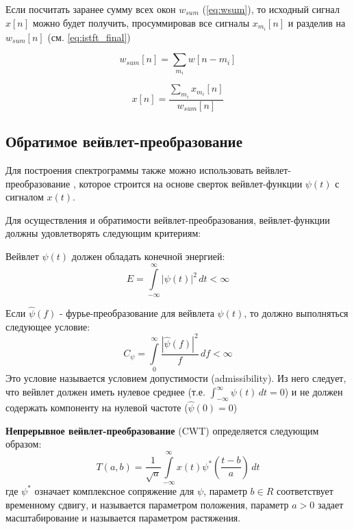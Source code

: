 Если посчитать заранее сумму всех окон $w_{sum}$ (\ref{eq:wsum}), то исходный сигнал $x[n]$ можно будет получить, 
просуммировав все сигналы $x_{m_i}[n]$ и разделив на $w_{sum}[n]$ (см. \ref{eq:istft_final})

\begin{equation}
  w_{sum}[n] = \sum_{m_i} w[n-m_i]
  \label{eq:wsum}
\end{equation}

\begin{equation}
  x[n] = \frac{\sum_{m_i} x_{m_i}[n]}{w_{sum}[n]} 
  \label{eq:istft_final}
\end{equation}


\subsection{Обратимое вейвлет-преобразование}

Для построения спектрограммы также можно использовать вейвлет-преобразование \cite{mallat2008wavelet}, 
которое строится на основе сверток вейвлет-функции $\psi(t)$ с сигналом $x(t)$.

Для осуществления и обратимости вейвлет-преобразования, вейвлет-функции должны удовлетворять следующим критериям:

Вейвлет $\psi(t)$ должен обладать конечной энергией: 
\begin{equation}
  E=\int \limits _{-\infty }^{\infty }{|\psi (t)|}^{2}\,dt<\infty
\end{equation}

Если ${\hat{\psi }}(f)$ - фурье-преобразование для вейвлета $\psi (t)$, то должно выполняться следующее условие:
\begin{equation}
  C_{\psi }=\int \limits _{0}^{\infty }{\frac {{|{\hat {\psi }}(f)|}^{2}}{f}}\,df<\infty
\end{equation}
Это условие называется условием допустимости (admissibility). Из него следует, что вейвлет должен иметь нулевое среднее 
(т.е. $\int_{-\infty}^{\infty}{\psi(t)}\,dt = 0$) и не должен содержать компоненту на нулевой частоте (${\hat{\psi }}(0) = 0$)

\textbf{Непрерывное вейвлет-преобразование} (CWT) \cite{mallat2008wavelet} определяется следующим образом:
\begin{equation}
  T(a,b)={\frac {1}{\sqrt {a}}}\int \limits _{-\infty }^{\infty }x(t)\psi ^{*}\left({\frac {t-b}{a}}\right)\,dt
\end{equation}
где ${\psi }^{*}$ означает комплексное сопряжение для $\psi$, параметр $b\in R$ соответствует временному сдвигу, и называется параметром положения, 
параметр $a>0$ задает масштабирование и называется параметром растяжения. 

